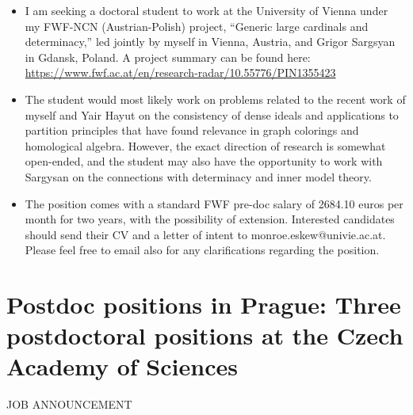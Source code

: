 \documentclass[prodmode,acmtecs]{acmsmall} %
\begin{document}
\begin{itemize}\item I am seeking a doctoral student to work at the University of Vienna under my FWF-NCN (Austrian-Polish) project, “Generic large cardinals and determinacy,” led jointly by myself in Vienna, Austria, and Grigor Sargsyan in Gdansk, Poland.  A project summary can be found here: \href{https://www.fwf.ac.at/en/research-radar/10.55776/PIN1355423}{https://www.fwf.ac.at/en/research-radar/10.55776/PIN1355423} 
 
\item  The student would most likely work on problems related to the recent work of myself and Yair Hayut on the consistency of dense ideals and applications to partition principles that have found relevance in graph colorings and homological algebra.  However, the exact direction of research is somewhat open-ended, and the student may also have the opportunity to work with Sargysan on the connections with determinacy and inner model theory. 
 
\item  The position comes with a standard FWF pre-doc salary of 2684.10 euros per month for two years, with the possibility of extension. Interested candidates should send their CV and a letter of intent to monroe.eskew@univie.ac.at.  Please feel free to email also for any clarifications regarding the position. 
 
\end{itemize}\section{Postdoc positions in Prague: Three postdoctoral positions at the Czech Academy of Sciences}\label{PostdocpositionsinPrague}JOB ANNOUNCEMENT 
\end{document}
